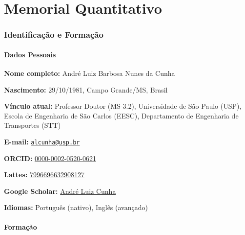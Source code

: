 \documentclass[
  brazilian,
  11pt,
  a4paper,
]{article}
\author{}
\date{\vspace{-2.5em}}
\begin{document}
\part{Memorial Quantitativo}

\section{Identificação e
Formação}\label{identificauxe7uxe3o-e-formauxe7uxe3o}

\subsection{Dados Pessoais}\label{dados-pessoais}

\textbf{Nome completo:} André Luiz Barbosa Nunes da Cunha

\textbf{Nascimento:} 29/10/1981, Campo Grande/MS, Brasil

\textbf{Vínculo atual:} Professor Doutor (MS-3.2), Universidade de São
Paulo (USP), Escola de Engenharia de São Carlos (EESC), Departamento de
Engenharia de Transportes (STT)

\textbf{E-mail:}
\href{mailto:alcunha@usp.br}{\nolinkurl{alcunha@usp.br}}

\textbf{ORCID:}
\href{https://orcid.org/0000-0002-0520-0621}{0000-0002-0520-0621}

\textbf{Lattes:}
\href{http://lattes.cnpq.br/7996696632908127}{7996696632908127}

\textbf{Google Scholar:}
\href{https://scholar.google.com.br/citations?user=HI0CQJMAAAAJ}{André
Luiz Cunha}

\textbf{Idiomas:} Português (nativo), Inglês (avançado)

\subsection{Formação}\label{formauxe7uxe3o}
\end{document}
